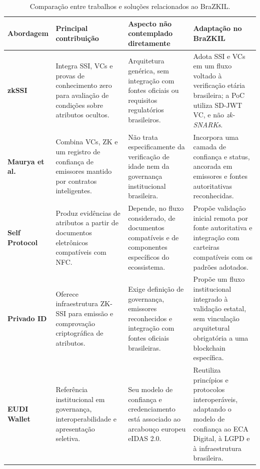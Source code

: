 \documentclass[12pt]{article}
\begin{document}
\begin{table}[t]
\centering
\caption{Comparação entre trabalhos e soluções relacionados ao BraZKIL.}
\label{tab:estado-arte-brazkil}
\footnotesize
\renewcommand{\arraystretch}{1.15}
\setlength{\tabcolsep}{5pt}
\begin{tabularx}{\textwidth}{@{}lXXX@{}}
\toprule
\textbf{Abordagem} &
\textbf{Principal contribuição} &
\textbf{Aspecto não contemplado diretamente} &
\textbf{Adaptação no BraZKIL} \\
\midrule

\textbf{zkSSI} &
Integra SSI, VCs e provas de conhecimento zero para avaliação de condições sobre atributos ocultos. &
Arquitetura genérica, sem integração com fontes oficiais ou requisitos regulatórios brasileiros. &
Adota SSI e VCs em um fluxo voltado à verificação etária brasileira; a PoC utiliza SD-JWT VC, e não \textit{zk-SNARKs}. \\

\textbf{Maurya et al.} &
Combina VCs, ZK e um registro de confiança de emissores mantido por contratos inteligentes. &
Não trata especificamente da verificação de idade nem da governança institucional brasileira. &
Incorpora uma camada de confiança e status, ancorada em emissores e fontes autoritativas reconhecidas. \\

\textbf{Self Protocol} &
Produz evidências de atributos a partir de documentos eletrônicos compatíveis com NFC. &
Depende, no fluxo considerado, de documentos compatíveis e de componentes específicos do ecossistema. &
Propõe validação inicial remota por fonte autoritativa e integração com carteiras compatíveis com os padrões adotados. \\

\textbf{Privado ID} &
Oferece infraestrutura ZK-SSI para emissão e comprovação criptográfica de atributos. &
Exige definição de governança, emissores reconhecidos e integração com fontes oficiais brasileiras. &
Propõe um fluxo institucional integrado à validação estatal, sem vinculação arquitetural obrigatória a uma blockchain específica. \\

\textbf{EUDI Wallet} &
Referência institucional em governança, interoperabilidade e apresentação seletiva. &
Seu modelo de confiança e credenciamento está associado ao arcabouço europeu eIDAS 2.0. &
Reutiliza princípios e protocolos interoperáveis, adaptando o modelo de confiança ao ECA Digital, à LGPD e à infraestrutura brasileira. \\

\bottomrule
\end{tabularx}
\end{table}
\end{document}
